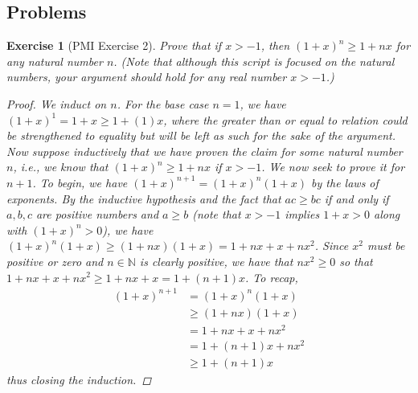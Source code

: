 \documentclass[titlepage]{article}
\newcounter{script}
\newtheorem{exercise}{Exercise}[script]
\newcommand{\N}{\mathbb{N}}
\begin{document}
\subsection{Problems}
\setcounter{exercise}{1}
\begin{exercise}[PMI Exercise 2]
    Prove that if $x>-1$, then $(1+x)^n\geq 1+nx$ for any natural number $n$. (Note that although this script is focused on the natural numbers, your argument should hold for any real number $x>-1$.)
    \begin{proof}
        We induct on $n$. For the base case $n=1$, we have $(1+x)^1=1+x\geq 1+(1)x$, where the greater than or equal to relation could be strengthened to equality but will be left as such for the sake of the argument. Now suppose inductively that we have proven the claim for some natural number $n$, i.e., we know that $(1+x)^n\geq 1+nx$ if $x>-1$. We now seek to prove it for $n+1$. To begin, we have $(1+x)^{n+1}=(1+x)^n(1+x)$ by the laws of exponents. By the inductive hypothesis and the fact that $ac\geq bc$ if and only if $a,b,c$ are positive numbers and $a\geq b$ (note that $x>-1$ implies $1+x>0$ along with $(1+x)^n>0$), we have $(1+x)^n(1+x)\geq (1+nx)(1+x)=1+nx+x+nx^2$. Since $x^2$ must be positive or zero and $n\in\N$ is clearly positive, we have that $nx^2\geq 0$ so that $1+nx+x+nx^2\geq 1+nx+x=1+(n+1)x$. To recap,
        \begin{align*}
            (1+x)^{n+1} &= (1+x)^n(1+x)\\
            &\geq (1+nx)(1+x)\\
            &= 1+nx+x+nx^2\\
            &= 1+(n+1)x+nx^2\\
            &\geq 1+(n+1)x
        \end{align*}
        thus closing the induction.
    \end{proof}
\end{exercise}

\setcounter{theorem}{11}
\end{document}

